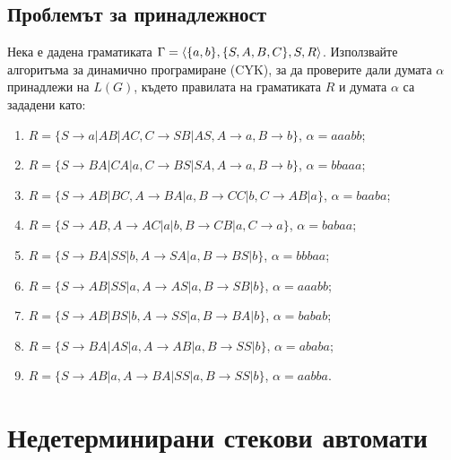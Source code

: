 \subsection{Проблемът за принадлежност}

\begin{problem}
  Нека е дадена граматиката $\Gamma=\langle{\{a,b\}, \{S,A,B,C\},S,R}\rangle$.
  Използвайте алгоритъма за динамично програмиране (CYK), за да проверите дали
  думата $\alpha$ принадлежи на $L(G)$, където правилата на граматиката $R$ и думата $\alpha$
  са зададени като:
  \begin{enumerate}
  \item
    $R =\{S\rightarrow a| AB|AC, C\rightarrow SB|AS,A\rightarrow a, B\rightarrow b\}$, $\alpha=aaabb$;
  \item
    $R = \{S\rightarrow BA| CA|a, C\rightarrow BS|SA,A\rightarrow a, B\rightarrow b\}$, $\alpha=bbaaa$;
  \item
    $R =\{S\rightarrow AB|BC, A\rightarrow BA|a,B\rightarrow CC|b, C\rightarrow AB|a\}$, $\alpha=baaba$;
  \item
    $R = \{S\rightarrow AB, A\rightarrow AC|a|b,B\rightarrow CB|a, C\rightarrow a\}$, $\alpha=babaa$;
  \item
    $R = \{S\rightarrow BA|SS|b, A\rightarrow SA|a,B\rightarrow BS|b\}$, $\alpha = bbbaa$;
  \item
    $R = \{S\rightarrow AB|SS|a, A\rightarrow AS|a,B\rightarrow SB|b\}$, $\alpha = aaabb$;
  \item
    $R = \{S\rightarrow AB| BS|b, A\rightarrow SS|a,B\rightarrow BA|b\}$, $\alpha = babab$;
  \item
    $R = \{S\rightarrow BA| AS|a, A\rightarrow AB|a,B\rightarrow SS|b\}$, $\alpha = ababa$;
  \item
    $R = \{S\rightarrow AB|a, A\rightarrow BA|SS|a,B\rightarrow SS|b\}$, $\alpha = aabba$.
  \end{enumerate}
\end{problem}


\section{Недетерминирани стекови автомати}


